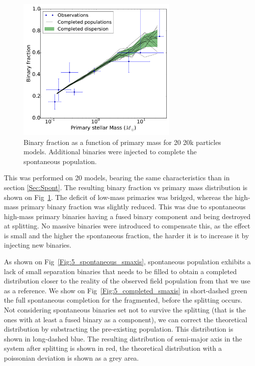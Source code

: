 \begin{figure}
\begin{center}
\includegraphics[width=0.7\textwidth]{Figures/5_completed_primarymass}
\caption{ Binary fraction as a function of primary mass for 20 20k particles models. Additional binaries were injected to complete the spontaneous population.}
\label{Fig:5_completed_primarymass}
\end{center}
\end{figure}

This was performed on 20 models, bearing the same characteristics than in section \ref{Sec:Spont}. The resulting binary fraction vs primary mass distribution is shown on Fig~\ref{Fig:5_completed_primarymass}. The deficit of low-mass primaries was bridged, whereas the high-mass primary binary fraction was slightly reduced. This was due to spontaneous high-mass primary binaries having a fused binary component and being destroyed at splitting. No massive binaries were introduced to compensate this, as the effect is small and the higher the spontaneous fraction, the harder it is to increase it by injecting new binaries.

As shown on Fig~\ref{Fig:5_spontaneous_smaxis}, spontaneous population exhibits a lack of small separation binaries that needs to be filled to obtain a completed distribution closer to the reality of the observed field population from \cite{Raghavan2010} that we use as a reference. We show on Fig~\ref{Fig:5_completed_smaxis} in short-dashed green the full spontaneous completion for the fragmented, before the splitting occurs. Not considering spontaneous binaries set not to survive the splitting (that is the ones with at least a fused binary as a component), we can correct the theoretical distribution by substracting the pre-existing population. This distribution is shown in long-dashed blue. The resulting distribution of semi-major axis in the system after splitting is shown in red, the theoretical distribution with a poissonian deviation is shown as a grey area.

